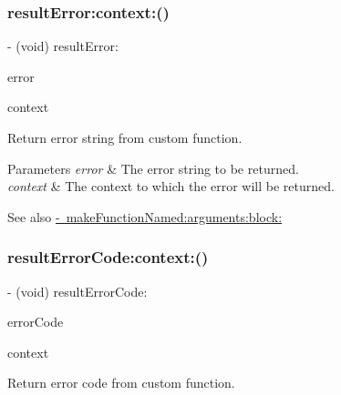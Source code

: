 \subsubsection{\texorpdfstring{result\+Error\+:context\+:()}{resultError:context:()}}
{\footnotesize\ttfamily -\/ (void) result\+Error\+: \begin{DoxyParamCaption}\item[{(N\+S\+String $\ast$)}]{error }\item[{context:(void $\ast$)}]{context }\end{DoxyParamCaption}}

Return error string from custom function.


\begin{DoxyParams}{Parameters}
{\em error} & The error string to be returned. \\
\hline
{\em context} & The context to which the error will be returned.\\
\hline
\end{DoxyParams}
\begin{DoxySeeAlso}{See also}
\mbox{\hyperlink{interface_o_p_t_l_y_f_m_d_b_database_af2c3e10041c8d0a95e2feb84a2ffa645}{-\/ make\+Function\+Named\+:arguments\+:block\+:}} 
\end{DoxySeeAlso}
\mbox{\label{interface_o_p_t_l_y_f_m_d_b_database_a08861b58136840fe405473721abcd26f}} 
\subsubsection{\texorpdfstring{result\+Error\+Code\+:context\+:()}{resultErrorCode:context:()}}
{\footnotesize\ttfamily -\/ (void) result\+Error\+Code\+: \begin{DoxyParamCaption}\item[{(int)}]{error\+Code }\item[{context:(void $\ast$)}]{context }\end{DoxyParamCaption}}

Return error code from custom function.


